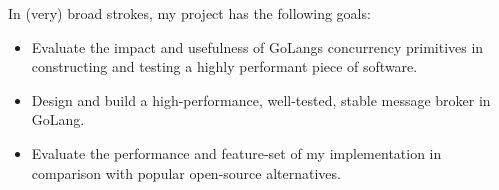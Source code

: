 In (very) broad strokes, my project has the following goals:

 \begin{itemize}
   \item Evaluate the impact and usefulness of GoLangs concurrency primitives in
   constructing and testing a highly performant piece of software.
   \item Design and build a high-performance, well-tested, stable message broker
   in GoLang.
   \item Evaluate the performance and feature-set of my implementation in
   comparison with popular open-source alternatives.
 \end{itemize}
